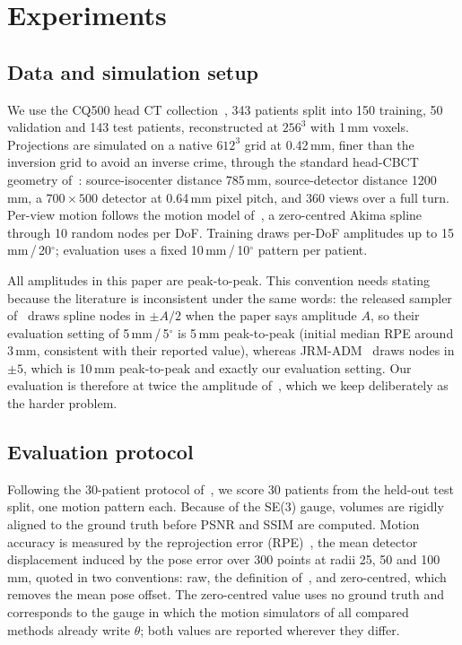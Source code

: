 \documentclass[11pt]{article}
\begin{document}
\section{Experiments}
\label{sec:setup}

\subsection{Data and simulation setup}
\label{sec:data}

We use the CQ500 head CT collection~\cite{cq500}, 343 patients split into 150 training, 50
validation and 143 test patients, reconstructed at $256^3$ with 1\,mm voxels. Projections are
simulated on a native $612^3$ grid at 0.42\,mm, finer than the inversion grid to avoid an
inverse crime, through the standard head-CBCT geometry of~\cite{thies25}: source-isocenter
distance 785\,mm, source-detector distance 1200\,mm, a $700\times500$ detector at 0.64\,mm
pixel pitch, and 360 views over a full turn. Per-view motion follows the motion model
of~\cite{thies25}, a zero-centred Akima spline~\cite{akima70} through 10 random nodes per
DoF. Training draws per-DoF amplitudes up to 15\,mm\,/\,20$^\circ$; evaluation uses a fixed
10\,mm\,/\,10$^\circ$ pattern per patient.

All amplitudes in this paper are peak-to-peak. This convention needs stating because the
literature is inconsistent under the same words: the released sampler of~\cite{thies25} draws
spline nodes in $\pm A/2$ when the paper says amplitude $A$, so their evaluation setting of
5\,mm\,/\,5$^\circ$ is 5\,mm peak-to-peak (initial median RPE around 3\,mm, consistent with
their reported value), whereas JRM-ADM~\cite{depaepe25} draws nodes in $\pm5$, which is
10\,mm peak-to-peak and exactly our evaluation setting. Our evaluation is therefore at twice
the amplitude of~\cite{thies25}, which we keep deliberately as the harder problem.

\subsection{Evaluation protocol}
\label{sec:protocol}

Following the 30-patient protocol of~\cite{thies25}, we score 30 patients from the held-out
test split, one motion pattern each. Because of the SE(3) gauge, volumes are rigidly aligned
to the ground truth before PSNR and SSIM are computed. Motion accuracy is measured by the
reprojection error (RPE)~\cite{thies25}, the mean detector displacement induced by the pose
error over 300 points at radii 25, 50 and 100\,mm, quoted in two conventions: raw, the
definition of~\cite{thies25}, and zero-centred, which removes the mean pose offset. The
zero-centred value uses no ground truth and corresponds to the gauge in which the motion
simulators of all compared methods already write $\theta$; both values are reported wherever
they differ.
\end{document}
